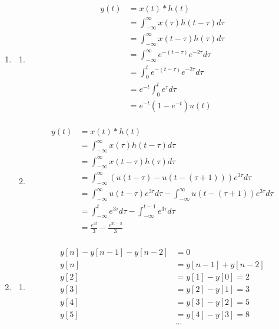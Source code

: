 \documentclass[10pt,a4paper, margin=1in]{article}
\begin{document}
\begin{enumerate}
\item %
    \begin{enumerate}
    \item %


    \begin{align*}
        y(t) & = x(t) * h(t) \\
        & = \int_{-\infty}^{\infty} x(\tau) h(t - \tau) d\tau \\
        & = \int_{-\infty}^{\infty} x(t - \tau) h(\tau) d\tau \\
        & = \int_{-\infty}^{\infty} e^{-(t - \tau)} e^{-2\tau} d\tau \\
        & = \int_{0}^{t} e^{-(t - \tau)} e^{-2\tau} d\tau \\
        & = e^{-t} \int_{0}^{t} e^{\tau} d\tau \\
        & = e^{-t} \left(1 - e^{-t}\right)u(t) \\
    \end{align*}
    \item %
    \begin{align*}
        y(t) & = x(t) * h(t) \\
        & = \int_{-\infty}^{\infty} x(\tau) h(t - \tau) d\tau \\
        & = \int_{-\infty}^{\infty} x(t - \tau) h(\tau) d\tau \\
        & = \int_{-\infty}^{\infty} \left(u(t - \tau) - u(t - (\tau + 1))\right) e^{3\tau} d\tau \\
        & = \int_{-\infty}^{\infty} u(t - \tau) e^{3\tau} d\tau - \int_{-\infty}^{\infty} u(t - (\tau + 1)) e^{3\tau} d\tau \\
        & = \int_{-\infty}^{t} e^{3\tau} d\tau - \int_{-\infty}^{t - 1} e^{3\tau} d\tau \\
        & = \frac{e^{3t}}{3} - \frac{e^{3t - 3}}{3}\\
    \end{align*}
    \end{enumerate}

\item %
    \begin{enumerate}   
    \item %
    \begin{align*}
        y[n] - y[n - 1] - y[n - 2] & = 0\\
        y[n] & = y[n - 1] + y[n - 2]\\
        y[2] & = y[1] - y[0] = 2\\
        y[3] & = y[2] - y[1] = 3\\
        y[4] & = y[3] - y[2] = 5\\
        y[5] & = y[4] - y[3] = 8\\
        & ... \\
    \end{align*}


\end{enumerate}
\end{enumerate}
\end{document}

